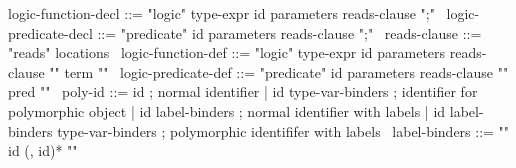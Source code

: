 \begin{syntax}
  logic-function-decl ::= "logic" type-expr id parameters reads-clause ";"
  \
  logic-predicate-decl ::= "predicate" id parameters reads-clause ";"
  \
  reads-clause ::= "reads" locations
  \
  logic-function-def ::= "logic" type-expr id parameters reads-clause "{" term "}"
  \
  logic-predicate-def ::= "predicate" id parameters reads-clause "{" pred "}"
  \
  poly-id ::= id ; normal identifier
  | id type-var-binders ; identifier for polymorphic object 
  | id label-binders ; normal identifier with labels
  | id label-binders type-var-binders ; polymorphic identififer with labels
  \ 
  label-binders ::= "{" id (, id)* "}" 
\end{syntax}
